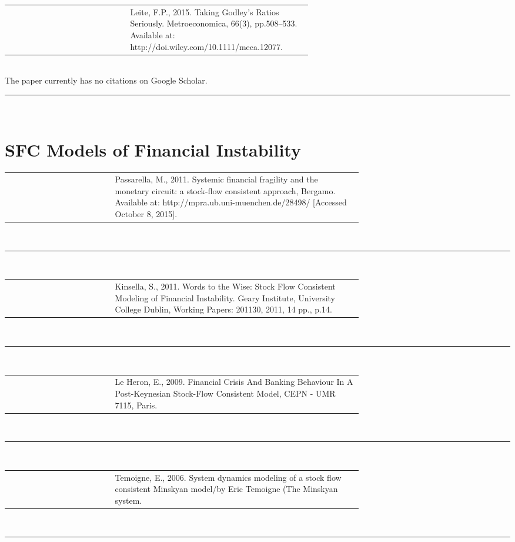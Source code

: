 \documentclass[twoside,a4paper,11pt]{article}
\begin{document}
\begin{tabular}{lp{0.6\linewidth}}
\cite{Leite2015} & Leite, F.P., 2015. Taking Godley’s Ratios Seriously. Metroeconomica, 66(3), pp.508–533. Available at: http://doi.wiley.com/10.1111/meca.12077.
\end{tabular}\\[5pt]
The paper currently has no citations on Google Scholar.
\begin{center}
\rule{10cm}{1pt}   \\[5pt]
\end{center}

 \section{SFC Models of  Financial Instability}
\begin{tabular}{lp{0.7\linewidth}}
\cite{Passarella2011a} & Passarella, M., 2011. Systemic financial fragility and the monetary circuit: a stock-flow consistent approach, Bergamo. Available at: http://mpra.ub.uni-muenchen.de/28498/ [Accessed October 8, 2015].
\end{tabular}\\[5pt]
\begin{center}
\rule{10cm}{1pt}   \\[5pt]
\end{center}

\begin{tabular}{lp{0.7\linewidth}}
\cite{Kinsella2011} & Kinsella, S., 2011. Words to the Wise: Stock Flow Consistent Modeling of Financial Instability. Geary Institute, University College Dublin, Working Papers: 201130, 2011, 14 pp., p.14.
\end{tabular}\\[5pt]
\begin{center}
\rule{10cm}{1pt}   \\[5pt]
\end{center}

\begin{tabular}{lp{0.7\linewidth}}
\cite{LeHeron2009a} & Le Heron, E., 2009. Financial Crisis And Banking Behaviour In A Post-Keynesian Stock-Flow Consistent Model, CEPN - UMR 7115, Paris.
\end{tabular}\\[5pt]
\begin{center}
\rule{10cm}{1pt}   \\[5pt]
\end{center}

\begin{tabular}{lp{0.7\linewidth}}
\cite{Tymoigne2006a} & Temoigne, E., 2006. System dynamics modeling of a stock flow consistent Minskyan model/by Eric Temoigne (The Minskyan system.
\end{tabular}\\[5pt]
\begin{center}
\rule{10cm}{1pt}   \\[5pt]
\end{center}
\end{document}
